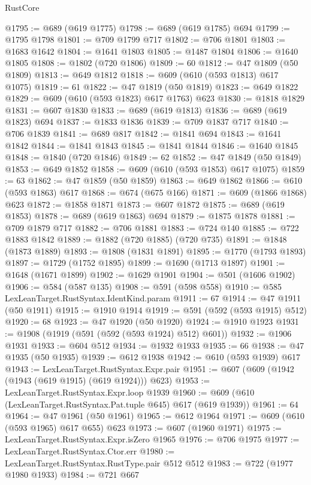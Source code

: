 \begin{lexlean}{RustCore}
\begin{coremodule}
@1795 := @689 (@619 @1775)
@1798 := @689 (@619 @1785) @694
@1799 := @1795 @1798
@1801 := @709 @1799 @717
@1802 := @706 @1801
@1803 := @1683 @1642
@1804 := @1641 @1803
@1805 := @1487 @1804
@1806 := @1640 @1805
@1808 := @1802 (@720 @1806)
@1809 := 60
@1812 := @47 @1809 (@50 @1809)
@1813 := @649 @1812
@1818 := @609 (@610 (@593 @1813) @617 @1075)
@1819 := 61
@1822 := @47 @1819 (@50 @1819)
@1823 := @649 @1822
@1829 := @609 (@610 (@593 @1823) @617 @1763) @623
@1830 := @1818 @1829
@1831 := @607 @1830
@1833 := @689 (@619 @1813)
@1836 := @689 (@619 @1823) @694
@1837 := @1833 @1836
@1839 := @709 @1837 @717
@1840 := @706 @1839
@1841 := @689 @817
@1842 := @1841 @694
@1843 := @1641 @1842
@1844 := @1841 @1843
@1845 := @1841 @1844
@1846 := @1640 @1845
@1848 := @1840 (@720 @1846)
@1849 := 62
@1852 := @47 @1849 (@50 @1849)
@1853 := @649 @1852
@1858 := @609 (@610 (@593 @1853) @617 @1075)
@1859 := 63
@1862 := @47 @1859 (@50 @1859)
@1863 := @649 @1862
@1866 := @610 (@593 @1863) @617
@1868 := @674 (@675 @166)
@1871 := @609 (@1866 @1868) @623
@1872 := @1858 @1871
@1873 := @607 @1872
@1875 := @689 (@619 @1853)
@1878 := @689 (@619 @1863) @694
@1879 := @1875 @1878
@1881 := @709 @1879 @717
@1882 := @706 @1881
@1883 := @724 @140
@1885 := @722 @1883 @1842
@1889 := @1882 (@720 @1885) (@720 @735)
@1891 := @1848 (@1873 @1889)
@1893 := @1808 (@1831 @1891)
@1895 := @1770 (@1793 @1893)
@1897 := @1729 (@1752 @1895)
@1899 := @1690 (@1713 @1897)
@1901 := @1648 (@1671 @1899)
@1902 := @1629 @1901
@1904 := @501 (@1606 @1902)
@1906 := @584 (@587 @135)
@1908 := @591 (@598 @558)
@1910 := @585 LexLeanTarget.RustSyntax.IdentKind.param
@1911 := 67
@1914 := @47 @1911 (@50 @1911)
@1915 := @1910 @1914
@1919 := @591 (@592 (@593 @1915) @512)
@1920 := 68
@1923 := @47 @1920 (@50 @1920)
@1924 := @1910 @1923
@1931 := @1908 (@1919 (@591 (@592 (@593 @1924) @512) @601))
@1932 := @1906 @1931
@1933 := @604 @512
@1934 := @1932 @1933
@1935 := 66
@1938 := @47 @1935 (@50 @1935)
@1939 := @612 @1938
@1942 := @610 (@593 @1939) @617
@1943 := LexLeanTarget.RustSyntax.Expr.pair
@1951 := @607 (@609 (@1942 (@1943 (@619 @1915) (@619 @1924))) @623)
@1953 := LexLeanTarget.RustSyntax.Expr.loop @1939
@1960 := @609 (@610 (LexLeanTarget.RustSyntax.Pat.tuple @645) @617 (@619 @1939))
@1961 := 64
@1964 := @47 @1961 (@50 @1961)
@1965 := @612 @1964
@1971 := @609 (@610 (@593 @1965) @617 @655) @623
@1973 := @607 (@1960 @1971)
@1975 := LexLeanTarget.RustSyntax.Expr.isZero @1965
@1976 := @706 @1975
@1977 := LexLeanTarget.RustSyntax.Ctor.err
@1980 := LexLeanTarget.RustSyntax.RustType.pair @512 @512
@1983 := @722 (@1977 @1980 @1933)
@1984 := @721 @667

\end{coremodule}
\end{lexlean}
